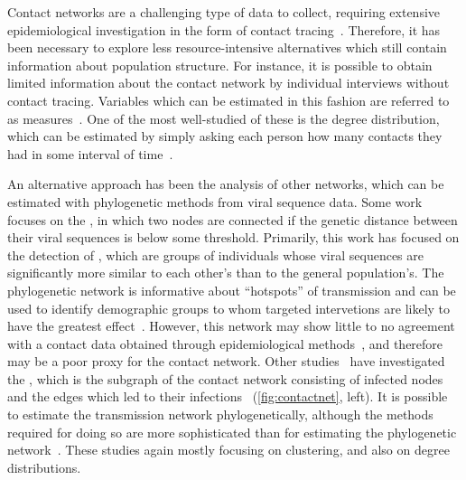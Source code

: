 Contact networks are a challenging type of data to collect, requiring extensive
epidemiological investigation in the form of contact
tracing~\autocite{morris1993epidemiology, welch2011statistical,
keeling2005networks}. Therefore, it has been necessary to explore less
resource-intensive alternatives which still contain information about
population structure. For instance, it is possible to obtain limited
information about the contact network by individual interviews without contact
tracing. Variables which can be estimated in this fashion are referred to as
 measures~\autocite{wasserman1994social}. One of the most
well-studied of these is the degree distribution, which can be estimated by
simply asking each person how many contacts they had in some interval of
time~\autocite{liljeros2001web, schneeberger2004scale, colgate1989risk}.

An alternative approach has been the analysis of other networks, which can be
estimated with phylogenetic methods from viral sequence data. Some work focuses
on the , in which two nodes are connected if the
genetic distance between their viral sequences is below some threshold.
Primarily, this work has focused on the detection of , which are groups of individuals whose viral sequences are
significantly more similar to each other's than to the general population's.
The phylogenetic network is informative about ``hotspots'' of transmission and
can be used to identify demographic groups to whom targeted intervetions are
likely to have the greatest effect~\autocite{poon2014impact}.  However, this
network may show little to no agreement with a contact data obtained through
epidemiological methods~\autocite{yirrell1998molecular, resik2007limitations,
robinson2013dynamics}, and therefore may be a poor proxy for the contact
network. Other studies~\autocite{brown2011transmission} have investigated the
, which is the subgraph of the contact network
consisting of infected nodes and the edges which led to their
infections~\autocite{welch2011statistical} (\cref{fig:contactnet}, left). It is
possible to estimate the transmission network phylogenetically, although the
methods required for doing so are more sophisticated than for estimating the
phylogenetic network~\autocite{brown2011transmission}. These studies again
mostly focusing on clustering, and also on degree distributions.

